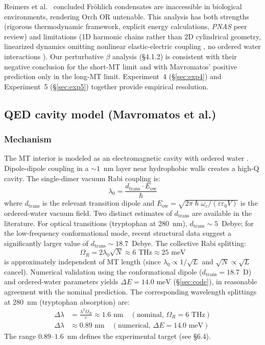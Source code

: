 \documentclass[twocolumn,10pt]{article}
\renewcommand{\hbar}{\hslash}
\newcommand{\meV}{\text{~meV}}
\newcommand{\THz}{\text{~THz}}
\begin{document}
Reimers et al.\ \cite{Reimers2009} concluded Fr\"ohlich condensates are
inaccessible in biological environments, rendering Orch OR untenable. This
analysis has both strengths (rigorous thermodynamic framework, explicit
energy calculations, \textit{PNAS} peer review) and limitations (1D
harmonic chains rather than 2D cylindrical geometry, linearized dynamics
omitting nonlinear elastic-electric coupling \cite{Pokorn2011}, no ordered
water interactions \cite{Mavromatos2025}). Our perturbative $\beta$
analysis (\S 4.1.2) is consistent with their negative conclusion for the
short-MT limit and with Mavromatos' positive prediction only in the
long-MT limit. Experiment~4 (\S\ref{sec:exp4}) and Experiment~5
(\S\ref{sec:exp5}) together provide empirical resolution.


\subsection{QED cavity model (Mavromatos et al.)}

\subsubsection{Mechanism}

The MT interior is modeled as an electromagnetic cavity with ordered water
\cite{DelGiudice1988,Sahu2013}. Dipole-dipole coupling in a $\sim 1$~nm
layer near hydrophobic walls creates a high-Q cavity. The single-dimer
vacuum Rabi coupling is:
\begin{equation}
\lambda_0 = \frac{d_{\text{trans}} \cdot E_{\text{ow}}}{\hbar}
\label{eq:lambda0}
\end{equation}
where $d_{\text{trans}}$ is the relevant transition dipole and
$E_{\text{ow}} = \sqrt{2\pi\hbar\omega_c/(\varepsilon\varepsilon_0 V)}$ is
the ordered-water vacuum field. Two distinct estimates of $d_{\text{trans}}$
are available in the literature. For optical transitions (tryptophan at
280~nm), $d_{\text{trans}} \sim 5$~Debye; for the low-frequency
conformational mode, recent structural data \cite{Nogales1998} suggest a
significantly larger value of $d_{\text{trans}} \sim 18.7$~Debye. The
collective Rabi splitting:
\begin{equation}
\Omega_R = 2\lambda_0\sqrt{N} \approx 6\THz \approx 25\meV
\label{eq:rabi_splitting}
\end{equation}
is approximately independent of MT length (since $\lambda_0 \propto
1/\sqrt{L}$ and $\sqrt{N} \propto \sqrt{L}$ cancel). Numerical validation
using the conformational dipole ($d_{\text{trans}} = 18.7$~D) and
ordered-water parameters yields $\Delta E = 14.0\meV$
(\S\ref{sec:code}), in reasonable agreement with the nominal prediction.
The corresponding wavelength splittings at 280~nm (tryptophan absorption)
are:
\begin{align}
\Delta\lambda &= \frac{\lambda^2 \Omega_R}{c}
\approx 1.6\text{~nm} \quad (\text{nominal, } \Omega_R = 6\THz) \label{eq:delta_lambda_nom} \\
\Delta\lambda &\approx 0.89\text{~nm}
\quad (\text{numerical, } \Delta E = 14.0\meV) \label{eq:delta_lambda_num}
\end{align}
The range $0.89\text{--}1.6$~nm defines the experimental target
(see \S 6.4).
\end{document}

